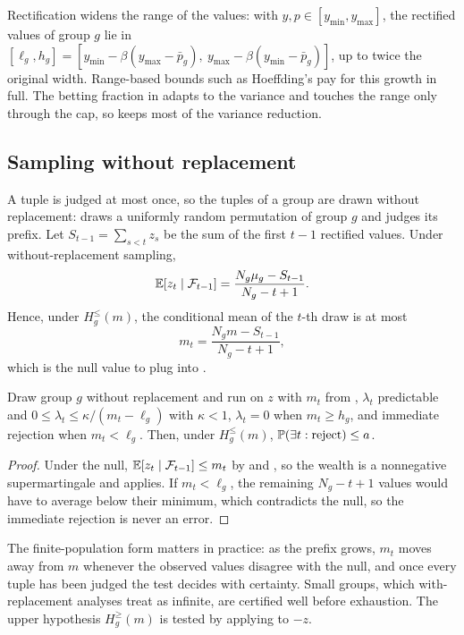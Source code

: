 Rectification widens the range of the values: with $y,p\in[y_{\min},y_{\max}]$, the rectified values of group $g$ lie in $[\ell_g,h_g]=[y_{\min}-\beta(y_{\max}-\bar p_g),\ y_{\max}-\beta(y_{\min}-\bar p_g)]$, up to twice the original width.
Range-based bounds such as Hoeffding's pay for this growth in full.
The betting fraction in  adapts to the variance and touches the range only through the cap, so \sys{} keeps most of the variance reduction.

\subsection{Sampling without replacement}
\label{sec:wor}

A tuple is judged at most once, so the tuples of a group are drawn without replacement: \sys{} draws a uniformly random permutation of group $g$ and judges its prefix.
Let $S_{t-1}=\sum_{s<t}z_s$ be the sum of the first $t-1$ rectified values.
Under without-replacement sampling,
\begin{equation}
\mathbb{E}[z_t\mid\mathcal{F}_{t-1}]=\frac{N_g\mu_g-S_{t-1}}{N_g-t+1}.
\end{equation}
Hence, under $H^{\le}_g(m)$, the conditional mean of the $t$-th draw is at most
\begin{equation}
m_t=\frac{N_g m-S_{t-1}}{N_g-t+1},
\label{eq:mt}
\end{equation}
which is the null value to plug into .

\begin{proposition}
\label{prop:one}
Draw group $g$ without replacement and run  on $z$ with $m_t$ from , $\lambda_t$ predictable and $0\le\lambda_t\le\kappa/(m_t-\ell_g)$ with $\kappa<1$, $\lambda_t=0$ when $m_t\ge h_g$, and immediate rejection when $m_t<\ell_g$.
Then, under $H^{\le}_g(m)$, $\mathbb{P}(\exists t:\text{reject})\le a$.
\end{proposition}
\begin{proof}
Under the null, $\mathbb{E}[z_t\mid\mathcal{F}_{t-1}]\le m_t$ by  and , so the wealth is a nonnegative supermartingale and  applies.
If $m_t<\ell_g$, the remaining $N_g-t+1$ values would have to average below their minimum, which contradicts the null, so the immediate rejection is never an error.
\end{proof}

The finite-population form matters in practice: as the prefix grows, $m_t$ moves away from $m$ whenever the observed values disagree with the null, and once every tuple has been judged the test decides with certainty.
Small groups, which with-replacement analyses treat as infinite, are certified well before exhaustion.
The upper hypothesis $H^{\ge}_g(m)$ is tested by applying  to $-z$.

